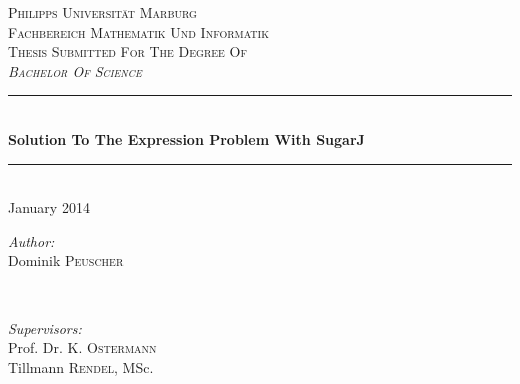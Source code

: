 \documentclass{report}
\begin{document}
\begin{titlepage}

\newcommand{\HRule}{\rule{\linewidth}{0.5mm}} %

\center

\textsc{\LARGE Philipps Universit\"at Marburg}\\[1.5cm] %
\textsc{\Large Fachbereich Mathematik Und Informatik}\\[0.5cm] %
\textsc{\large Thesis Submitted For The Degree Of \\\emph{Bachelor Of Science}}\\[0.5cm] %

\HRule \\[0.4cm]
{ \huge \bfseries Solution To The Expression Problem With SugarJ}\\[0.4cm]
\HRule \\[0.5cm]
{\large January 2014}\\[1cm]
 
\begin{minipage}[t][1.5cm][t]{0.4\textwidth}
\begin{flushleft} \large
\emph{Author:}\\
Dominik \textsc{Peuscher}\\
\end{flushleft}
\end{minipage}
~
\begin{minipage}[t][1.5cm][t]{0.4\textwidth}
\begin{flushright} \large
\emph{Supervisors:} \\
Prof. Dr. K. \textsc{Ostermann}\\
Tillmann \textsc{Rendel}, MSc.
\end{flushright}
\end{minipage}\\[3cm]


\scalebox{0.15}{}\\[2cm]


\vfill

\end{titlepage}

\end{document}
